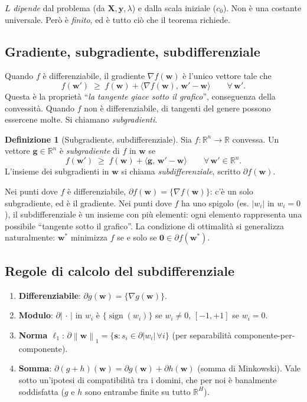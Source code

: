 \documentclass[11pt,a4paper]{article}
\newcommand{\R}{\mathbb{R}}
\newcommand{\norm}[1]{\left\|#1\right\|}
\newcommand{\inner}[2]{\langle #1,\,#2\rangle}
\newcommand{\bw}{\mathbf{w}}
\newcommand{\bg}{\mathbf{g}}
\newcommand{\by}{\mathbf{y}}
\newcommand{\bX}{\mathbf{X}}
\newcommand{\bs}{\mathbf{s}}
\newcommand{\bzero}{\mathbf{0}}
\theoremstyle{definition}
\newtheorem{definition}[theorem]{Definizione}
\begin{document}
\begin{tcolorbox}[warning]
$L$ \emph{dipende} dal problema (da $\bX, \by, \lambda$) e dalla scala iniziale ($c_0$). Non è una costante universale. Però è \emph{finito}, ed è tutto ciò che il teorema richiede.
\end{tcolorbox}

\subsection{Gradiente, subgradiente, subdifferenziale}

Quando $f$ è differenziabile, il gradiente $\nabla f(\bw)$ è l'unico vettore tale che
\[
f(\bw') \;\ge\; f(\bw) + \inner{\nabla f(\bw)}{\bw'-\bw}\qquad \forall\,\bw'.
\]
Questa è la proprietà ``\emph{la tangente giace sotto il grafico}'', conseguenza della convessità. Quando $f$ non è differenziabile, di tangenti del genere possono essercene molte. Si chiamano \emph{subgradienti}.

\begin{definition}[Subgradiente, subdifferenziale]
Sia $f:\R^n\to\R$ convessa. Un vettore $\bg\in\R^n$ è \emph{subgradiente} di $f$ in $\bw$ se
\begin{equation}
\label{eq:subgrad-ineq}
f(\bw') \;\ge\; f(\bw) + \inner{\bg}{\bw'-\bw}\qquad \forall\,\bw'\in\R^n.
\end{equation}
L'insieme dei subgradienti in $\bw$ si chiama \emph{subdifferenziale}, scritto $\partial f(\bw)$.
\end{definition}

\begin{tcolorbox}[intuition]
Nei punti dove $f$ è differenziabile, $\partial f(\bw) = \{\nabla f(\bw)\}$: c'è un solo subgradiente, ed è il gradiente. Nei punti dove $f$ ha uno spigolo (es. $|w_i|$ in $w_i=0$), il subdifferenziale è un insieme con più elementi: ogni elemento rappresenta una possibile ``tangente sotto il grafico''. La condizione di ottimalità si generalizza naturalmente: $\bw^*$ minimizza $f$ se e solo se $\bzero \in \partial f(\bw^*)$.
\end{tcolorbox}

\subsection{Regole di calcolo del subdifferenziale}

\begin{enumerate}[label=(R\arabic*),leftmargin=*]
\item \textbf{Differenziabile}: $\partial g(\bw) = \{\nabla g(\bw)\}$.
\item \textbf{Modulo}: $\partial|\,\cdot\,|$ in $w_i$ è $\{\operatorname{sign}(w_i)\}$ se $w_i\ne 0$, $[-1,+1]$ se $w_i=0$.
\item \textbf{Norma $\ell_1$}: $\partial\norm{\bw}_1 = \{\bs : s_i\in\partial|w_i|\,\forall i\}$ (per separabilità componente-per-componente).
\item \textbf{Somma}: $\partial(g+h)(\bw) = \partial g(\bw) + \partial h(\bw)$ (somma di Minkowski). Vale sotto un'ipotesi di compatibilità tra i domini, che per noi è banalmente soddisfatta ($g$ e $h$ sono entrambe finite su tutto $\R^H$).
\end{enumerate}
\end{document}
